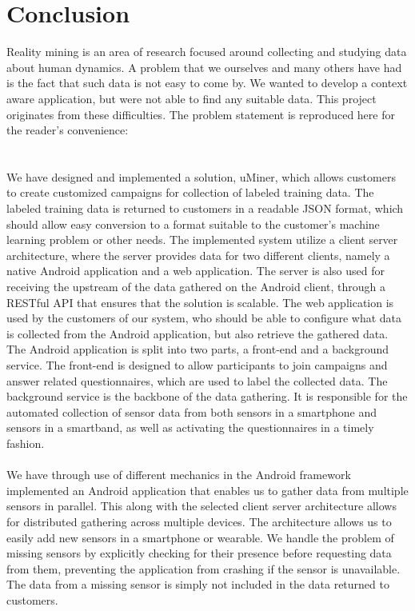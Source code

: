 
\chapter{Conclusion}
\label{cha:conclusion}
Reality mining is an area of research focused around collecting and studying data about human dynamics. A problem that we ourselves and many others have had is the fact that such data is not easy to come by. We wanted to develop a context aware application, but were not able to find any suitable data. This project originates from these difficulties. The problem statement is reproduced here for the reader's convenience:
\\

\\\\
We have designed and implemented a solution, uMiner, which allows customers to create customized campaigns for collection of labeled training data. The labeled training data is returned to customers in a readable JSON format, which should allow easy conversion to a format suitable to the customer's machine learning problem or other needs. The implemented system utilize a client server architecture, where the server provides data for two different clients, namely a native Android application and a web application. The server is also used for receiving the upstream of the data gathered on the Android client, through a RESTful API that ensures that the solution is scalable. The web application is used by the customers of our system, who should be able to configure what data is collected from the Android application, but also retrieve the gathered data. The Android application is split into two parts, a front-end and a background service. The front-end is designed to allow participants to join campaigns and answer related questionnaires, which are used to label the collected data. The background service is the backbone of the data gathering. It is responsible for the automated collection of sensor data from both sensors in a smartphone and sensors in a smartband, as well as activating the questionnaires in a timely fashion.  
\\\\
We have through use of different mechanics in the Android framework implemented an Android application that enables us to gather data from multiple sensors in parallel. This along with the selected client server architecture allows for distributed gathering across multiple devices. The architecture allows us to easily add new sensors in a smartphone or wearable. We handle the problem of missing sensors by explicitly checking for their presence before requesting data from them, preventing the application from crashing if the sensor is unavailable. The data from a missing sensor is simply not included in the data returned to customers.
